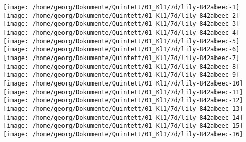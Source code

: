 \texttt{[image: /home/georg/Dokumente/Quintett/01\_Kl1/7d/lily-842abeec-1]}%
\ifx\betweenLilyPondSystem \undefined
  \linebreak
\else
  \expandafter{}%
\fi
\texttt{[image: /home/georg/Dokumente/Quintett/01\_Kl1/7d/lily-842abeec-2]}%
\ifx\betweenLilyPondSystem \undefined
  \linebreak
\else
  \expandafter{}%
\fi
\texttt{[image: /home/georg/Dokumente/Quintett/01\_Kl1/7d/lily-842abeec-3]}%
\ifx\betweenLilyPondSystem \undefined
  \linebreak
\else
  \expandafter{}%
\fi
\texttt{[image: /home/georg/Dokumente/Quintett/01\_Kl1/7d/lily-842abeec-4]}%
\ifx\betweenLilyPondSystem \undefined
  \linebreak
\else
  \expandafter{}%
\fi
\texttt{[image: /home/georg/Dokumente/Quintett/01\_Kl1/7d/lily-842abeec-5]}%
\ifx\betweenLilyPondSystem \undefined
  \linebreak
\else
  \expandafter{}%
\fi
\texttt{[image: /home/georg/Dokumente/Quintett/01\_Kl1/7d/lily-842abeec-6]}%
\ifx\betweenLilyPondSystem \undefined
  \linebreak
\else
  \expandafter{}%
\fi
\texttt{[image: /home/georg/Dokumente/Quintett/01\_Kl1/7d/lily-842abeec-7]}%
\ifx\betweenLilyPondSystem \undefined
  \linebreak
\else
  \expandafter{}%
\fi
\texttt{[image: /home/georg/Dokumente/Quintett/01\_Kl1/7d/lily-842abeec-8]}%
\ifx\betweenLilyPondSystem \undefined
  \linebreak
\else
  \expandafter{}%
\fi
\texttt{[image: /home/georg/Dokumente/Quintett/01\_Kl1/7d/lily-842abeec-9]}%
\ifx\betweenLilyPondSystem \undefined
  \linebreak
\else
  \expandafter{}%
\fi
\texttt{[image: /home/georg/Dokumente/Quintett/01\_Kl1/7d/lily-842abeec-10]}%
\ifx\betweenLilyPondSystem \undefined
  \linebreak
\else
  \expandafter{}%
\fi
\texttt{[image: /home/georg/Dokumente/Quintett/01\_Kl1/7d/lily-842abeec-11]}%
\ifx\betweenLilyPondSystem \undefined
  \linebreak
\else
  \expandafter{}%
\fi
\texttt{[image: /home/georg/Dokumente/Quintett/01\_Kl1/7d/lily-842abeec-12]}%
\ifx\betweenLilyPondSystem \undefined
  \linebreak
\else
  \expandafter{}%
\fi
\texttt{[image: /home/georg/Dokumente/Quintett/01\_Kl1/7d/lily-842abeec-13]}%
\ifx\betweenLilyPondSystem \undefined
  \linebreak
\else
  \expandafter{}%
\fi
\texttt{[image: /home/georg/Dokumente/Quintett/01\_Kl1/7d/lily-842abeec-14]}%
\ifx\betweenLilyPondSystem \undefined
  \linebreak
\else
  \expandafter{}%
\fi
\texttt{[image: /home/georg/Dokumente/Quintett/01\_Kl1/7d/lily-842abeec-15]}%
\ifx\betweenLilyPondSystem \undefined
  \linebreak
\else
  \expandafter{}%
\fi
\texttt{[image: /home/georg/Dokumente/Quintett/01\_Kl1/7d/lily-842abeec-16]}%
